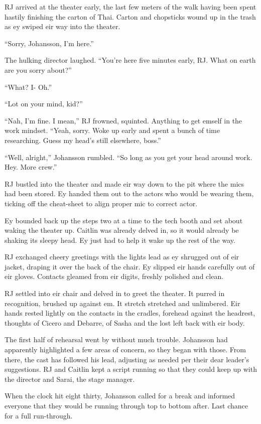 RJ arrived at the theater early, the last few meters of the walk having been spent hastily finishing the carton of Thai. Carton and chopsticks wound up in the trash as ey swiped eir way into the theater.

``Sorry, Johansson, I'm here.''

The hulking director laughed. ``You're here five minutes early, RJ. What on earth are you sorry about?''

``What? I- Oh.''

``Lot on your mind, kid?''

``Nah, I'm fine. I mean,'' RJ frowned, squinted. Anything to get emself in the work mindset. ``Yeah, sorry. Woke up early and spent a bunch of time researching. Guess my head's still elsewhere, boss.''

``Well, alright,'' Johansson rumbled. ``So long as you get your head around work. Hey. More crew.''

RJ bustled into the theater and made eir way down to the pit where the mics had been stored. Ey handed them out to the actors who would be wearing them, ticking off the cheat-sheet to align proper mic to correct actor.

Ey bounded back up the steps two at a time to the tech booth and set about waking the theater up. Caitlin was already delved in, so it would already be shaking its sleepy head. Ey just had to help it wake up the rest of the way.

RJ exchanged cheery greetings with the lights lead as ey shrugged out of eir jacket, draping it over the back of the chair. Ey slipped eir hands carefully out of eir gloves. Contacts gleamed from eir digits, freshly polished and clean.

RJ settled into eir chair and delved in to greet the theater. It purred in recognition, brushed up against em. It stretch stretched and unlimbered. Eir hands rested lightly on the contacts in the cradles, forehead against the headrest, thoughts of Cicero and Debarre, of Sasha and the lost left back with eir body.

The first half of rehearsal went by without much trouble. Johansson had apparently highlighted a few areas of concern, so they began with those. From there, the cast has followed his lead, adjusting as needed per their dear leader's suggestions. RJ and Caitlin kept a script running so that they could keep up with the director and Sarai, the stage manager.

When the clock hit eight thirty, Johansson called for a break and informed everyone that they would be running through top to bottom after. Last chance for a full run-through.

